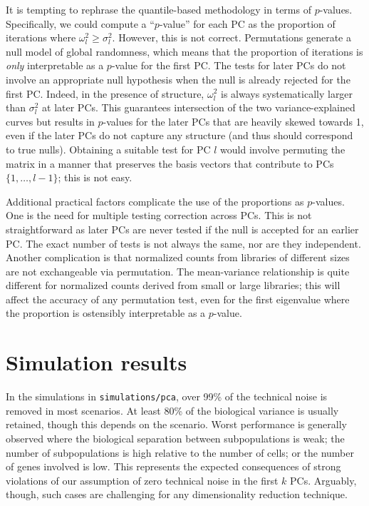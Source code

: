\documentclass{article}
\begin{document}
It is tempting to rephrase the quantile-based methodology in terms of $p$-values. 
Specifically, we could compute a ``$p$-value'' for each PC as the proportion of iterations where $\omega^2_l \ge \sigma^2_l$.
However, this is not correct.
Permutations generate a null model of global randomness, which means that the proportion of iterations is \textit{only} interpretable as a $p$-value for the first PC.
The tests for later PCs do not involve an appropriate null hypothesis when the null is already rejected for the first PC.
Indeed, in the presence of structure, $\omega^2_l$ is always systematically larger than $\sigma^2_l$ at later PCs.
This guarantees intersection of the two variance-explained curves but results in $p$-values for the later PCs that are heavily skewed towards 1, 
even if the later PCs do not capture any structure (and thus should correspond to true nulls).
Obtaining a suitable test for PC $l$ would involve permuting the matrix in a manner that preserves the basis vectors that contribute to PCs $\{1, \ldots, l-1\}$; this is not easy.

Additional practical factors complicate the use of the proportions as $p$-values.
One is the need for multiple testing correction across PCs.
This is not straightforward as later PCs are never tested if the null is accepted for an earlier PC.
The exact number of tests is not always the same, nor are they independent. 
Another complication is that normalized counts from libraries of different sizes are not exchangeable via permutation.
The mean-variance relationship is quite different for normalized counts derived from small or large libraries; 
this will affect the accuracy of any permutation test, even for the first eigenvalue where the proportion is ostensibly interpretable as a $p$-value.

\section{Simulation results}
In the simulations in \verb!simulations/pca!, over 99\% of the technical noise is removed in most scenarios.
At least 80\% of the biological variance is usually retained, though this depends on the scenario.
Worst performance is generally observed where the biological separation between subpopulations is weak;
the number of subpopulations is high relative to the number of cells; or the number of genes involved is low.
This represents the expected consequences of strong violations of our assumption of zero technical noise in the first $k$ PCs.
Arguably, though, such cases are challenging for any dimensionality reduction technique.
\end{document}
